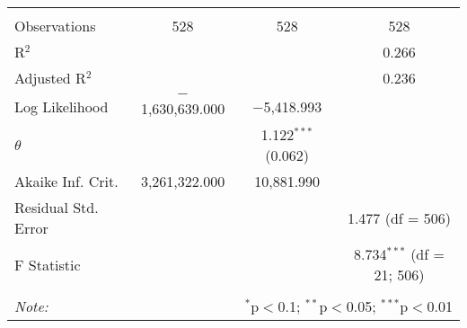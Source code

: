\begin{table}[!htbp]
\begin{tabular}{@{\extracolsep{5pt}}lccc}
 \hline \\[-1.8ex] 
Observations & 528 & 528 & 528 \\ 
R$^{2}$ &  &  & 0.266 \\ 
Adjusted R$^{2}$ &  &  & 0.236 \\ 
Log Likelihood & $-$1,630,639.000 & $-$5,418.993 &  \\ 
$\theta$ &  & 1.122$^{***}$  (0.062) &  \\ 
Akaike Inf. Crit. & 3,261,322.000 & 10,881.990 &  \\ 
Residual Std. Error &  &  & 1.477 (df = 506) \\ 
F Statistic &  &  & 8.734$^{***}$ (df = 21; 506) \\ 
\hline 
\hline \\[-1.8ex] 
\textit{Note:}  & \multicolumn{3}{r}{$^{*}$p$<$0.1; $^{**}$p$<$0.05; $^{***}$p$<$0.01} \\ 
\end{tabular} 
\end{table} 
